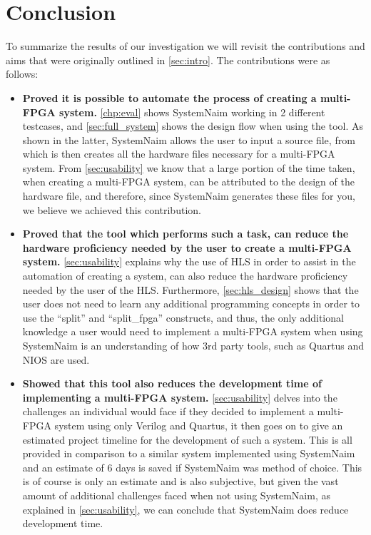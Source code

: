 \chapter{Conclusion}

To summarize the results of our investigation we will revisit the contributions and aims that were originally outlined in \autoref{sec:intro}. The contributions were as follows:

\begin{itemize}
    \item \textbf{Proved it is possible to automate the process of creating a multi-FPGA system.} \autoref{chp:eval} shows SystemNaim working in 2 different testcases, and \autoref{sec:full_system} shows the design flow when using the tool. As shown in the latter, SystemNaim allows the user to input a source file, from which is then creates all the hardware files necessary for a multi-FPGA system. From \autoref{sec:usability} we know that a large portion of the time taken, when creating a multi-FPGA system, can be attributed to the design of the hardware file, and therefore, since SystemNaim generates these files for you, we believe we achieved this contribution.
    \item \textbf{Proved that the tool which performs such a task, can reduce the hardware proficiency needed by the user to create a multi-FPGA system.} \autoref{sec:usability} explains why the use of HLS in order to assist in the automation of creating a system, can also reduce the hardware proficiency needed by the user of the HLS. Furthermore, \autoref{sec:hls_design} shows that the user does not need to learn any additional programming concepts in order to use the “split” and “split\_fpga” constructs, and thus, the only additional knowledge a user would need to implement a multi-FPGA system when using SystemNaim is an understanding of how 3rd party tools, such as Quartus and NIOS are used.
    \item \textbf{Showed that this tool also reduces the development time of implementing a multi-FPGA system.} \autoref{sec:usability} delves into the challenges an individual would face if they decided to implement a multi-FPGA system using only Verilog and Quartus, it then goes on to give an estimated project timeline for the development of such a system. This is all provided in comparison to a similar system implemented using SystemNaim and an estimate of 6 days is saved if SystemNaim was method of choice. This is of course is only an estimate and is also subjective, but given the vast amount of additional challenges faced when not using SystemNaim, as explained in \autoref{sec:usability}, we can conclude that SystemNaim does reduce development time.

\end{itemize}
